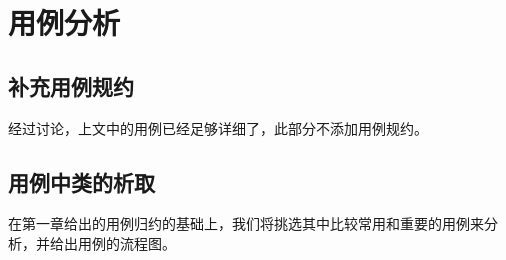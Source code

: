 \chapter{用例分析}
	
\section{补充用例规约}
	经过讨论，上文中的用例已经足够详细了，此部分不添加用例规约。
\section{用例中类的析取}
    在第一章给出的用例归约的基础上，我们将挑选其中比较常用和重要的用例来分析，并给出用例的流程图。
    
